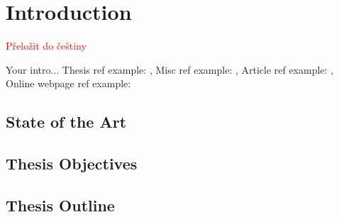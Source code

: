 \chapter{Introduction} \label{chap:introduction}

\textcolor{red}{Přeložit do češtiny}

Your intro... Thesis ref example: \cite{bulin:2016}, Misc ref example: \cite{smidl:pc}, Article ref example: \cite{mcculloch:neuron}, Online webpage ref example: \cite{online:xor_solution}

\section{State of the Art} \label{sec:state_of_the_art}

\section{Thesis Objectives} \label{sec:thesis_objectives}

\section{Thesis Outline} \label{sec:thesis_outline}
